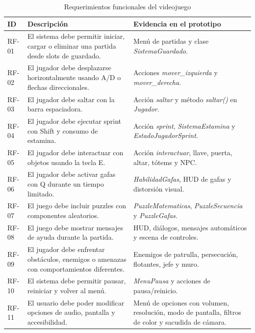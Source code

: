 \documentclass[conference]{IEEEtran}
\begin{document}
\begin{table}[t]
\caption{Requerimientos funcionales del videojuego}
\label{tab:req-funcionales}
\centering
\begin{tabularx}{\textwidth}{>{\raggedright\arraybackslash}p{1.2cm}X>{\raggedright\arraybackslash}p{3.6cm}}
\toprule
\textbf{ID} & \textbf{Descripción} & \textbf{Evidencia en el prototipo} \\
\midrule
RF-01 & El sistema debe permitir iniciar, cargar o eliminar una partida desde slots de guardado. & Menú de partidas y clase \textit{SistemaGuardado}. \\
RF-02 & El jugador debe desplazarse horizontalmente usando A/D o flechas direccionales. & Acciones \textit{mover\_izquierda} y \textit{mover\_derecha}. \\
RF-03 & El jugador debe saltar con la barra espaciadora. & Acción \textit{saltar} y método \textit{saltar()} en \textit{Jugador}. \\
RF-04 & El jugador debe ejecutar sprint con Shift y consumo de estamina. & Acción \textit{sprint}, \textit{SistemaEstamina} y \textit{EstadoJugadorSprint}. \\
RF-05 & El jugador debe interactuar con objetos usando la tecla E. & Acción \textit{interactuar}, llave, puerta, altar, tótems y NPC. \\
RF-06 & El jugador debe activar gafas con Q durante un tiempo limitado. & \textit{HabilidadGafas}, HUD de gafas y distorsión visual. \\
RF-07 & El juego debe incluir puzzles con componentes aleatorios. & \textit{PuzzleMatematicas}, \textit{PuzzleSecuencia} y \textit{PuzzleGafas}. \\
RF-08 & El juego debe mostrar mensajes de ayuda durante la partida. & HUD, diálogos, mensajes automáticos y escena de controles. \\
RF-09 & El jugador debe enfrentar obstáculos, enemigos o amenazas con comportamientos diferentes. & Enemigos de patrulla, persecución, flotantes, jefe y muro. \\
RF-10 & El sistema debe permitir pausar, reiniciar y volver al menú. & \textit{MenuPausa} y acciones de pausa/reinicio. \\
RF-11 & El usuario debe poder modificar opciones de audio, pantalla y accesibilidad. & Menú de opciones con volumen, resolución, modo de pantalla, filtros de color y sacudida de cámara. \\
\bottomrule
\end{tabularx}
\end{table}
\end{document}
